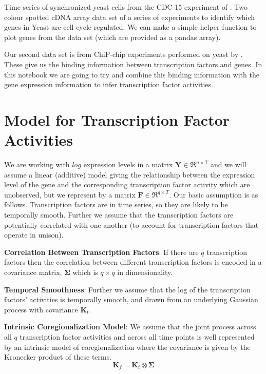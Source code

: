 Time series of synchronized yeast cells from the CDC-15 experiment of \cite{Spellman:1998}. 
Two colour spotted cDNA array data set of a series of experiments to identify which genes in Yeast are 
cell cycle regulated.
We can make a simple helper function to plot genes from the data set (which are provided as a pandas array).

Our second data set is from ChiP-chip experiments performed on yeast by \cite{Lee:2002}. 
These give us the binding information between transcription factors and genes. 
In this notebook we are going to try and combine this binding information with 
the gene expression information to infer transcription factor activities.

\section{Model for Transcription Factor Activities}

We are working with $log$ expression levels in a matrix $\mathbf{Y} \in \Re^{n\times T}$ and 
we will assume a linear (additive) model giving the relationship between the expression level 
of the gene and the corresponding transcription factor activity which are unobserved, but we 
represent by a matrix $\mathbf{F} \in \Re^{q\times T}$. Our basic assumption is as follows. 
Transcription factors are in time series, so they are likely to be temporally smooth. 
Further we assume that the transcription factors are potentially correlated with one another 
(to account for transcription factors that operate in unison). 

\textbf{Correlation Between Transcription Factors}:  
If there are $q$ transcription factors then the correlation between different transcription factors is 
encoded in a covariance matrix, $\boldsymbol{\Sigma}$ which is $q\times q$ in dimensionality. 

\textbf{Temporal Smoothness}: 
Further we assume that the log of the transcription factors' activities is temporally smooth, 
and drawn from an underlying Gaussian process with covariance $\mathbf{K}_t$. 

\textbf{ Intrinsic Coregionalization Model}: 
We assume that the joint process across all $q$ transcription factor activities and across all time points 
is well represented by an intrinsic model of coregionalization where the covariance is given by the 
Kronecker product of these terms.
\begin{equation} \label{eq:K}
  \mathbf{K}_f = \mathbf{K}_t \otimes \boldsymbol{\Sigma}
\end{equation}

